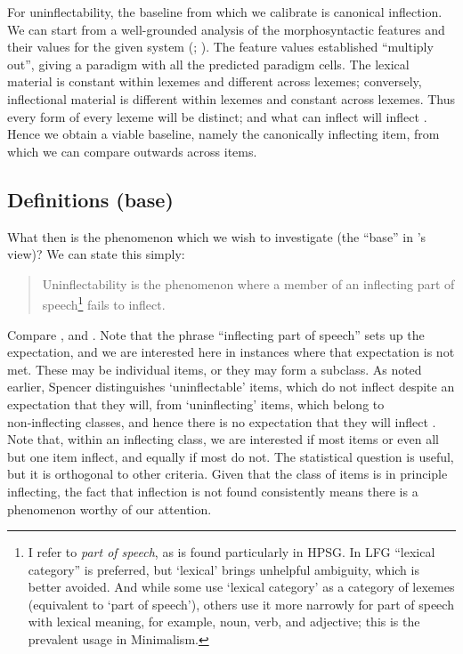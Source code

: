 \documentclass[output=paper,colorlinks,citecolor=brown]{langscibook}
\begin{document}
For uninflectability, the baseline from which we calibrate is canonical inflection. We can start from a well-grounded analysis of the morphosyntactic features and their values for the given system (\citealt{zaliznjak1973}; \citealt[73--88]{corbett2012}). The feature values established ``multiply out'', giving a paradigm with all the predicted paradigm cells. The lexical material is constant within lexemes and different across lexemes; conversely, inflectional material is different within lexemes and constant across lexemes. Thus every form of every lexeme will be distinct; and what can inflect will inflect \citep[150--151]{corbett2015}. Hence we obtain a viable baseline, namely the canonically inflecting item, from which we can compare outwards across items.

\subsection{Definitions (base)} \label{01sec2.2}

What then is the phenomenon which we wish to investigate (the ``base'' in \citeauthor{bond2013}'s \citeyear{bond2013} view)? We can state this simply:

\begin{quote}
	Uninflectability is the phenomenon where a member of an inflecting part of speech\footnote{I refer to \textit{part of speech}, as is found particularly in HPSG. In LFG ``lexical category'' is preferred, but `lexical' brings unhelpful ambiguity, which is better avoided. And while some use `lexical category' as a category of lexemes (equivalent to `part of speech'), others use it more narrowly for part of speech with lexical meaning, for example, noun, verb, and adjective; this is the prevalent usage in Minimalism.} fails to inflect.
\end{quote}

Compare \citet[27--35]{baermanbrowncorbett2005}, and \citet[142--143]{spencer2020}. Note that the phrase ``inflecting part of speech'' sets up the expectation, and we are interested here in instances where that expectation is not met. These may be individual items, or they may form a subclass. As noted earlier, Spencer distinguishes `uninflectable' items, which do not inflect despite an expectation that they will, from `uninflecting' items, which belong to non‑inflecting classes, and hence there is no expectation that they will inflect \citep[142]{spencer2020}. Note that, within an inflecting class, we are interested if most items or even all but one item inflect, and equally if most do not. The statistical question is useful, but it is orthogonal to other criteria. Given that the class of items is in principle inflecting, the fact that inflection is not found consistently means there is a phenomenon worthy of our attention.
\end{document}
